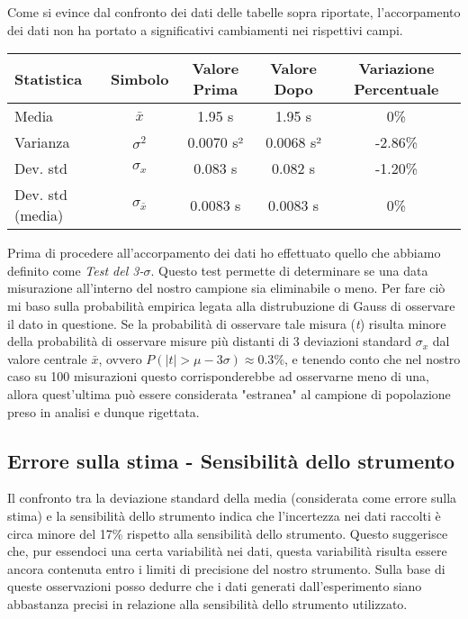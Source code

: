 \documentclass{article}
\begin{document}
\noindent
Come si evince dal confronto dei dati delle tabelle sopra riportate, l'accorpamento dei dati non ha portato a significativi cambiamenti nei rispettivi campi.
\begin{table}[ht]
\centering
{}
\begin{tabular}{lcccc}
\toprule
\textbf{Statistica} & \textbf{Simbolo} & \textbf{Valore Prima} & \textbf{Valore Dopo} & \textbf{Variazione Percentuale} \\
\midrule
Media & $\bar{x}$ & 1.95 s & 1.95 s & 0\% \\
Varianza & $\sigma^2$ & 0.0070 s² & 0.0068 s² & -2.86\% \\
Dev. std & $\sigma_x$ & 0.083 s & 0.082 s & -1.20\% \\
Dev. std (media) & $\sigma_{\bar{x}}$ & 0.0083 s & 0.0083 s & 0\% \\
\bottomrule
\end{tabular}
\label{tab:dati_accorpati}
\end{table}

Prima di procedere all'accorpamento dei dati ho effettuato quello che abbiamo definito come \textit{Test del 3-$\sigma$}. Questo test permette di determinare se una data misurazione all'interno del nostro campione sia eliminabile o meno. Per fare ciò mi baso sulla probabilità empirica legata alla distrubuzione di Gauss di osservare il dato in questione.
\newline\indent
Se la probabilità di osservare tale misura (\textit{t}) risulta minore della probabilità di osservare misure più distanti di 3 deviazioni standard $\sigma_x$ dal valore centrale $\bar{x}$, ovvero $P( |t| > \mu - 3\sigma) \approx 0.3\% $, e tenendo conto che nel nostro caso su 100 misurazioni questo corrisponderebbe ad osservarne meno di una, allora quest'ultima può essere considerata "estranea" al campione di popolazione preso in analisi e dunque rigettata.
\newline
\subsection{Errore sulla stima - Sensibilità dello strumento}
Il confronto tra la deviazione standard della media (considerata come errore sulla stima) e la sensibilità dello strumento indica che l'incertezza nei dati raccolti è circa minore del 17\% rispetto alla sensibilità dello strumento. Questo suggerisce che, pur essendoci una certa variabilità nei dati, questa variabilità risulta essere ancora contenuta entro i limiti di precisione del nostro strumento. Sulla base di queste osservazioni posso dedurre che i dati generati dall'esperimento siano abbastanza precisi in relazione alla sensibilità dello strumento utilizzato.
\end{document}
